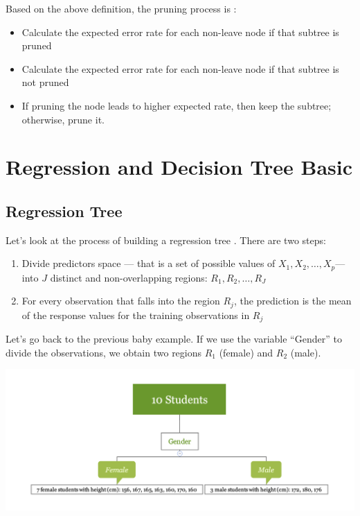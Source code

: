 \documentclass[12pt,]{krantz}
\providecommand{\tightlist}{%
  \setlength{\itemsep}{0pt}\setlength{\parskip}{0pt}}
\begin{document}
Based on the above definition, the pruning process is \citep{Espoito1997}:

\begin{itemize}
\tightlist
\item
  Calculate the expected error rate for each non-leave node if that subtree is pruned
\item
  Calculate the expected error rate for each non-leave node if that subtree is not pruned
\item
  If pruning the node leads to higher expected rate, then keep the subtree; otherwise, prune it.
\end{itemize}

\hypertarget{regression-and-decision-tree-basic}{%
\section{Regression and Decision Tree Basic}\label{regression-and-decision-tree-basic}}

\hypertarget{regression-tree}{%
\subsection{Regression Tree}\label{regression-tree}}

Let's look at the process of building a regression tree \citep{ISLR15}. There are two steps:

\begin{enumerate}
\def\labelenumi{\arabic{enumi}.}
\tightlist
\item
  Divide predictors space --- that is a set of possible values of \(X_1,X_2,\dots,X_p\)--- into \(J\) distinct and non-overlapping regions: \(R_1,R_2,\dots,R_J\)
\item
  For every observation that falls into the region \(R_j\), the prediction is the mean of the response values for the training observations in \(R_j\)
\end{enumerate}

Let's go back to the previous baby example. If we use the variable ``Gender'' to divide the observations, we obtain two regions \(R_1\) (female) and \(R_2\) (male).

\includegraphics{images/varEN.png}
\end{document}
